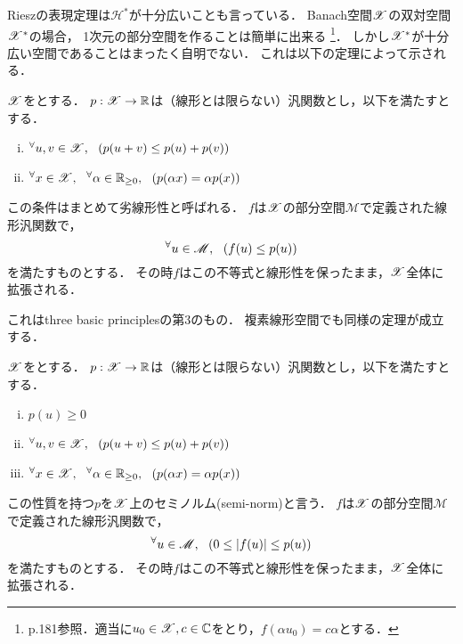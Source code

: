     Rieszの表現定理は$\mathscr{H}^{\ast}$が十分広いことも言っている．
    Banach空間$\mathscr{X}$の双対空間$\mathscr{X}^{\ast}$の場合，
    1次元の部分空間を作ることは簡単に出来る
    \footnote{p.181参照．適当に$u_0 \in \mathscr{X}, c \in \mathbb{C}$をとり，$f(\alpha u_0)=c \alpha$とする．}．
    しかし$\mathscr{X}^{\ast}$が十分広い空間であることはまったく自明でない．
    これは以下の定理によって示される．
    \begin{Them} \label{them8:11}
        $\mathscr{X}$をとする．
        $p:\mathscr{X} \to \mathbb{R}$は（線形とは限らない）汎関数とし，以下を満たすとする．
        \begin{enumerate}[i)]
            \setlength{\leftskip}{5truemm}
        \item ${}^{\forall} u, v \in \mathscr{X},~~ (p(u+v) \leq p(u)+p(v))$ 
        \item ${}^{\forall} x \in \mathscr{X},~~ {}^{\forall} \alpha \in \mathbb{R}_{\geq 0},~~ (p(\alpha x) = \alpha p(x))$
        \end{enumerate}
        この条件はまとめて劣線形性と呼ばれる．
        $f$は$\mathscr{X}$の部分空間$\mathscr{M}$で定義された線形汎関数で，
        \[ {}^{\forall} u \in \mathscr{M},~~ (f(u) \leq p(u)) \]
        を満たすものとする．
        その時$f$はこの不等式と線形性を保ったまま，$\mathscr{X}$全体に拡張される．
    \end{Them}
    これはthree basic principlesの第3のもの．
    複素線形空間でも同様の定理が成立する．

    \begin{Them}[定理8.13, p.184] \label{them8:13}
        $\mathscr{X}$をとする．
        $p:\mathscr{X} \to \mathbb{R}$は（線形とは限らない）汎関数とし，以下を満たすとする．
        \begin{enumerate}[i)]
            \setlength{\leftskip}{5truemm}
            \item $p(u) \geq 0$
            \item ${}^{\forall}  u, v \in \mathscr{X},~~ (p(u+v) \leq p(u)+p(v))$ 
            \item ${}^{\forall}  x \in \mathscr{X},~~ {}^{\forall} \alpha \in \mathbb{R}_{\geq 0},~~ (p(\alpha x) = \alpha p(x))$
        \end{enumerate}
        この性質を持つ$p$を$\mathscr{X}$上のセミノルム(semi-norm)と言う．
        $f$は$\mathscr{X}$の部分空間$\mathscr{M}$で定義された線形汎関数で，
        \[ {}^{\forall} u \in \mathscr{M},~~ (0 \leq |f(u)| \leq p(u)) \]
        を満たすものとする．
        その時$f$はこの不等式と線形性を保ったまま，$\mathscr{X}$全体に拡張される．
    \end{Them}

